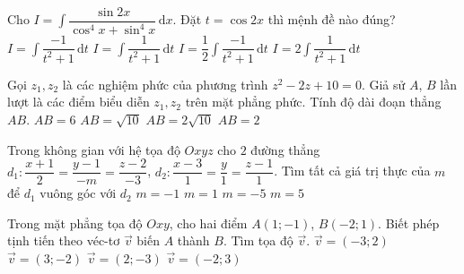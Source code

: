 \begin{ex}%
Cho $I =\displaystyle\int\limits \dfrac{\sin 2x}{\cos^4x+\sin^4x} \mathrm{\,d}x.$ Đặt $t= \cos 2x$ thì mệnh đề nào đúng? 
\choice
{\True $I = \displaystyle\int\limits \dfrac{-1}{t^2+1} \mathrm{\,d}t$}
{$I = \displaystyle\int\limits \dfrac{1}{t^2+1} \mathrm{\,d}t$}
{$I = \dfrac{1}{2}\displaystyle\int\limits \dfrac{-1}{t^2+1} \mathrm{\,d}t$}
{$I =2 \displaystyle\int\limits \dfrac{1}{t^2+1} \mathrm{\,d}t$}
\end{ex}

\begin{ex}%
Gọi  $z_1,z_2$ là các nghiệm phức của phương trình $z^2-2z+10 = 0$.  Giả  sử $A$, $B$    lần lượt là các điểm biểu diễn $z_1,z_2$  trên mặt phẳng phức. Tính độ  dài đoạn thẳng  $AB$. 
\choice
{\True $AB = 6$}
{$AB = \sqrt{10}$}
{$AB = 2\sqrt{10}$}
{$AB = 2$}
\end{ex}

\begin{ex}%
Trong không gian với hệ  tọa độ  $Oxyz$  cho $2$ đường thẳng $d_1: \dfrac{x+1}{2} = \dfrac{y-1}{-m} =\dfrac{z-2}{-3}$,  $d_2: \dfrac{x-3}{1} = \dfrac{y}{1} =\dfrac{z-1}{1}$. Tìm tất cả giá trị thực của $m$ để $d_1$ vuông góc với $d_2$
\choice
{\True $m=-1$}
{$m=1$}
{$m=-5$}
{$m=5$}
\end{ex}

\begin{ex}%
Trong mặt phẳng tọa độ $Oxy$, cho hai điểm $A(1;-1)$, $B(-2;1)$. Biết phép tịnh tiến theo 
  véc-tơ $\overrightarrow{v}$ biến  $A$   thành   $B$. Tìm  tọa độ  $\overrightarrow{v}$. 
\choice
{\True $\overrightarrow{v} = (-3;2)$}
{$\overrightarrow{v} = (3;-2)$}
{$\overrightarrow{v} = (2;-3)$}
{$\overrightarrow{v} = (-2;3)$}
\end{ex}

